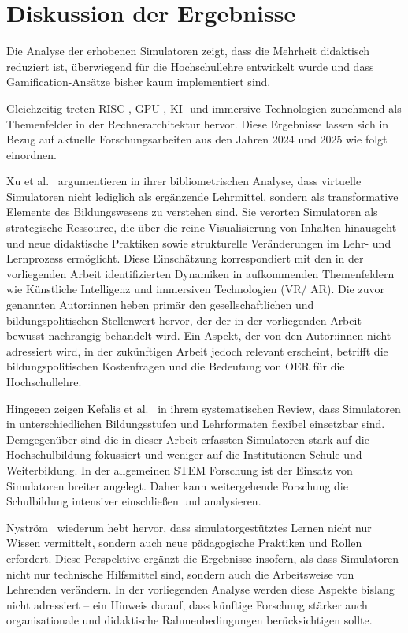 \section{Diskussion der Ergebnisse}

Die Analyse der erhobenen Simulatoren zeigt, dass die Mehrheit didaktisch reduziert ist, überwiegend für die Hochschullehre entwickelt wurde und dass Gamification-Ansätze bisher kaum implementiert sind.

Gleichzeitig treten \acs{RISC}-, GPU-, \acs{KI}- und immersive Technologien zunehmend als Themenfelder in der Rechnerarchitektur hervor. Diese Ergebnisse lassen sich in Bezug auf aktuelle Forschungsarbeiten aus den Jahren 2024 und 2025 wie folgt einordnen.

Xu et al.~\cite{xu_present_2025} argumentieren in ihrer bibliometrischen Analyse, dass virtuelle Simulatoren nicht lediglich als ergänzende Lehrmittel, sondern als transformative Elemente des Bildungswesens zu verstehen sind. Sie verorten Simulatoren als strategische Ressource, die über die reine Visualisierung von Inhalten hinausgeht und neue didaktische Praktiken sowie strukturelle Veränderungen im Lehr- und Lernprozess  ermöglicht. Diese Einschätzung korrespondiert mit den in der vorliegenden Arbeit identifizierten Dynamiken in aufkommenden Themenfeldern wie Künstliche Intelligenz und immersiven Technologien (\acs{VR}/ \acs{AR}). Die zuvor genannten Autor:innen heben primär den gesellschaftlichen und bildungspolitischen Stellenwert hervor, der der in der vorliegenden Arbeit bewusst nachrangig behandelt wird. Ein Aspekt, der von den Autor:innen nicht adressiert wird, in der zukünftigen Arbeit jedoch relevant erscheint, betrifft die bildungspolitischen Kostenfragen und die Bedeutung von \ac{OER} für die Hochschullehre. 

Hingegen zeigen Kefalis et al.~\cite{kefalis_digital_2025} in ihrem systematischen Review, dass Simulatoren in unterschiedlichen Bildungsstufen und Lehrformaten flexibel einsetzbar sind. Demgegenüber sind die in dieser Arbeit erfassten Simulatoren stark auf die Hochschulbildung fokussiert und weniger auf die Institutionen Schule und Weiterbildung. In der allgemeinen \acs{STEM} Forschung ist der Einsatz von Simulatoren breiter angelegt. Daher kann weitergehende Forschung die Schulbildung intensiver einschließen und analysieren.

Nyström~\cite{nystrom_teaching_2024} wiederum hebt hervor, dass simulatorgestütztes Lernen nicht nur Wissen vermittelt, sondern auch neue pädagogische Praktiken und Rollen erfordert. Diese Perspektive ergänzt die Ergebnisse insofern, als dass Simulatoren nicht nur technische Hilfsmittel sind, sondern auch die Arbeitsweise von Lehrenden verändern. In der vorliegenden Analyse werden diese Aspekte bislang nicht adressiert -- ein Hinweis darauf, dass künftige Forschung stärker auch organisationale und didaktische Rahmenbedingungen berücksichtigen sollte.

